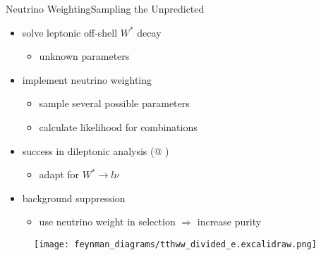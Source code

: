 \documentclass[9pt, aspectratio=169]{beamer}
\begin{document}
\begin{frame}{Neutrino Weighting}{Sampling the Unpredicted}
	\begin{minipage}{.58\textwidth}
		\begin{itemize}
			\item solve leptonic off-shell $W^*$ decay
			\begin{itemize}
				\item unknown parameters
			\end{itemize}
			\item implement neutrino weighting
			\begin{itemize}
				\item sample several possible parameters
				\item calculate likelihood for combinations
			\end{itemize}
			\item success in dileptonic \ttbar analysis (@ \atlas)
			\begin{itemize}
				\item adapt for $W^*\rightarrow l\nu$  
			\end{itemize}
			\item background suppression
			\begin{itemize}
				\item use neutrino weight in selection $\Rightarrow$ increase purity
			\end{itemize} 
		\end{itemize}
	\end{minipage}\hfill
	\begin{minipage}{.4\textwidth}
		\begin{figure}
			\centering
			\texttt{[image: feynman\_diagrams/tthww\_divided\_e.excalidraw.png]}	
		\end{figure}
	\end{minipage}
\end{frame}
\end{document}
